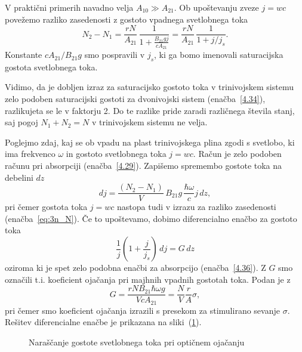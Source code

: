 V praktični primerih navadno velja $A_{10}\gg A_{21}$. Ob upoštevanju zveze $j=wc$ povežemo
razliko zasedenosti z gostoto vpadnega svetlobnega toka
\begin{equation}
N_{2}-N_{1}=\frac{rN}{A_{21}} \, \frac{1}{1+\frac{B_{21}gj}{c A_{21}}} = 
\frac{rN}{A_{21}} \, \frac{1}{1+j/j_s}.
\label{eq:3n_N}
\end{equation}
Konstante $c A_{21}/B_{21}g$ smo pospravili v $j_s$, ki ga bomo imenovali 
saturacijska gostota svetlobnega toka. 
\begin{remark}
 Vidimo, da je dobljen izraz za saturacijsko gostoto toka v trinivojskem sistemu zelo 
 podoben saturacijski gostoti za dvonivojski sistem (enačba~\ref{4.34}), razlikujeta se le
v faktorju 2. Do te razlike pride zaradi različnega števila stanj, saj pogoj $N_{1}+N_{2}=N$
v trinivojskem sistemu ne velja. 
\end{remark}

Poglejmo zdaj, kaj se ob vpadu na plast trinivojskega plina zgodi s svetlobo, ki 
ima frekvenco $\omega$ in gostoto svetlobnega toka $j=wc$. Račun je zelo podoben računu pri absorpciji (enačba~\ref{4.29}). Zapišemo
spremembo gostote toka na debelini $dz$ 
\begin{equation}
dj=\frac{(N_{2}-N_{1})}{V}\, B_{21}g\, \frac{\hbar\omega}{c}j\, dz,
\label{eq:dj}
\end{equation}
pri čemer gostota toka $j = wc$ nastopa tudi v izrazu za razliko zasedenosti (enačba~\ref{eq:3n_N}). 
Če to upoštevamo, dobimo diferencialno enačbo za gostoto toka
\begin{equation}
\frac{1}{j}\left(1+\frac{j}{j_{s}}\right)\, dj=G\, dz
\label{4.43}
\end{equation}
oziroma
ki je spet zelo podobna enačbi za absorpcijo (enačba~\ref{4.36}).
Z $G$ smo označili t.i. koeficient ojačanja pri majhnih vpadnih gostotah
toka. Podan je z 
\begin{equation}
G=\frac{rNB_{21}\hbar\omega g}{VcA_{21}} = \frac{N}{V}\frac{r}{A}\sigma,
\label{4.44}
\end{equation}
pri čemer smo koeficient ojačanja izrazili s presekom za stimulirano 
sevanje $\sigma$. 
Rešitev diferencialne enačbe je prikazana na sliki~(\ref{fig:ojacanje}). 
\begin{figure}[h]
\centering
\def\svgwidth{90truemm} 

\caption{Naraščanje gostote svetlobnega toka pri optičnem ojačanju}
\label{fig:ojacanje}
\end{figure}

